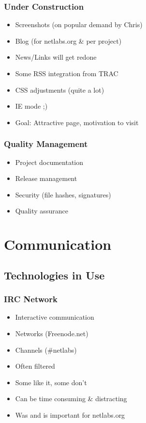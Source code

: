 \documentclass{beamer}
\begin{document}
\begin{frame}
\frametitle{Under Construction}
\begin{itemize}
  \item Screenshots (on popular demand by Chris)
  \item Blog (for netlabs.org \& per project)
  \item News/Links will get redone
  \item Some RSS integration from TRAC
  \item CSS adjustments (quite a lot)
  \item IE mode ;)
  \item Goal: Attractive page, motivation to visit
\end{itemize}
\end{frame}

\begin{frame}
\frametitle{Quality Management}
\begin{itemize}
  \item Project documentation
  \item Release management
  \item Security (file hashes, signatures)
  \item Quality assurance
\end{itemize}
\end{frame}


\section{Communication}
\subsection{Technologies in Use}

\begin{frame}
\frametitle{IRC Network}
\begin{itemize}
  \item Interactive communication
  \item Networks (Freenode.net)
  \item Channels (\#netlabs)
  \item Often filtered
  \item Some like it, some don't
  \item Can be time consuming \& distracting
  \item Was and is important for netlabs.org
\end{itemize}
\end{frame}
\end{document}
